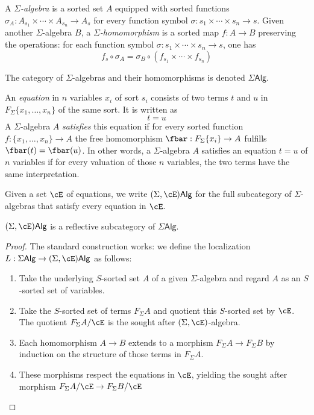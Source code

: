 \documentclass{amsart}
\begin{document}
\begin{defn}
  A \emph{$\Sigma$-algebra} is a sorted set $A$ equipped with sorted functions $\sigma_{A} : A_{s_{1}} \times \cdots \times A_{s_{n}} \to A_{s}$ for every function symbol $\sigma : s_{1} \times \cdots \times s_{n} \to s$.
  Given another $\Sigma$-algebra $B$, a \emph{$\Sigma$-homomorphism} is a sorted map $f : A \to B$ preserving the operations: for each function symbol $\sigma : s_{1} \times \cdots \times s_{n} \to s$, one has
  \[
    f_{s} \circ \sigma_{A} = \sigma_{B} \circ (f_{s_{1}} \times \cdots \times f_{s_{n}})
  \]

  The category of $\Sigma$-algebras and their homomorphisms is denoted $\Sigma\mathsf{Alg}$.
\end{defn}

\begin{defn}
  An \emph{equation} in $n$ variables $x_{i}$ of sort $s_{i}$ consists of two terms $t$ and $u$ in $F_{\Sigma}\{x_{1},\ldots,x_{n}\}$ of the same sort.
  It is written as
  \[
    t = u
  \]
  A $\Sigma$-algebra $A$ \emph{satisfies} this equation if for every sorted function $f : \{x_{1},\ldots,x_{n}\} \to A$ the free homomorphism $\fbar : F_{\Sigma}\{x_{i}\} \to A$ fulfills $\fbar(t) = \fbar(u)$.
  In other words, a $\Sigma$-algebra $A$ satisfies an equation $t = u$ of $n$ variables if for every valuation of those $n$ variables, the two terms have the same interpretation.
\end{defn}

\begin{defn}
  Given a set $\cE$ of equations, we write $(\Sigma,\cE)\mathsf{Alg}$ for the full subcategory of $\Sigma$-algebras that satisfy every equation in $\cE$.
\end{defn}

\begin{thm}
  $(\Sigma,\cE)\mathsf{Alg}$ is a reflective subcategory of $\Sigma\mathsf{Alg}$.
\end{thm}
\begin{proof}
  The standard construction works: we define the localization $L : \Sigma\mathsf{Alg} \to (\Sigma,\cE)\mathsf{Alg}$ as follows:
  \begin{enumerate}
  \item Take the underlying $S$-sorted set $A$ of a given $\Sigma$-algebra and regard $A$ as an $S$-sorted set of variables.
  \item Take the $S$-sorted set of terms $F_{\Sigma}A$ and quotient this $S$-sorted set by $\cE$.
    The quotient $F_{\Sigma}A/\cE$ is the sought after $(\Sigma,\cE)$-algebra.
  \item Each homomorphism $A \to B$ extends to a morphism $F_{\Sigma}A \to F_{\Sigma}B$ by induction on the structure of those terms in $F_{\Sigma}A$.
  \item These morphisms respect the equations in $\cE$, yielding the sought after morphism $F_{\Sigma}A/\cE \to F_{\Sigma}B/\cE$
  \end{enumerate}
\end{proof}
\end{document}
